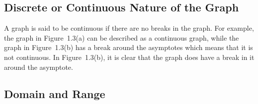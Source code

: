             \subsection{ Discrete or Continuous Nature of the Graph}
            \nopagebreak
        \label{m39337*id237022}A graph is said to be continuous if there are no breaks in the graph. For example, the graph in Figure~1.3(a) can be described as a continuous graph, while the graph in Figure~1.3(b) has a break around the asymptotes which means that it is not continuous.
In Figure~1.3(b), it is clear that the graph does have a break in it around the asymptote.\par 
\label{m39337*secfhsst!!!underscore!!!id796}
            \subsection{  Domain and Range }
            \nopagebreak
